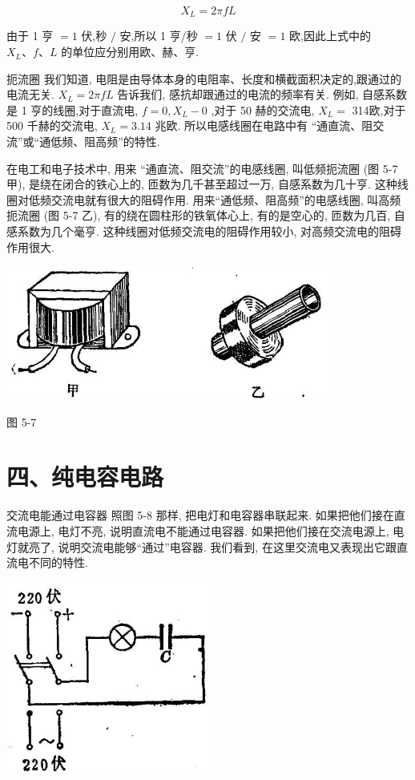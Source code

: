 \documentclass[10pt]{article}
\begin{document}
\[
{X}_{L} = {2\pi fL}
\]

由于 1 亨 \(= 1\) 伏,秒 \(/\) 安,所以 1 亨/秒 \(= 1\) 伏 \(/\) 安 \(= 1\) 欧,因此上式中的 \({X}_{L}\text{、}f\text{、}L\) 的单位应分别用欧、赫、亨.

扼流圈 我们知道, 电阻是由导体本身的电阻率、长度和横截面积决定的,跟通过的电流无关. \({X}_{L} = {2\pi fL}\) 告诉我们, 感抗却跟通过的电流的频率有关. 例如, 自感系数是 1 亨的线圈,对于直流电, \(f = 0,{X}_{L} - 0\) ,对于 50 赫的交流电, \({X}_{L} =\) 314欧,对于 500 千赫的交流电, \({X}_{L} = {3.14}\) 兆欧. 所以电感线圈在电路中有 “通直流、阻交流”或“通低频、阻高频”的特性.

在电工和电子技术中, 用来 “通直流、阻交流”的电感线圈, 叫低频扼流圈 (图 5-7 甲), 是绕在闭合的铁心上的, 匝数为几千甚至超过一万, 自感系数为几十亨. 这种线圈对低频交流电就有很大的阻碍作用. 用来“通低频、阻高频”的电感线圈, 叫高频扼流圈 (图 5-7 乙), 有的绕在圆柱形的铁氧体心上, 有的是空心的, 匝数为几百, 自感系数为几个毫亨. 这种线圈对低频交流电的阻碍作用较小, 对高频交流电的阻碍作用很大.

\begin{center}
\includegraphics[max width=0.8\textwidth]{images/01913056-1f15-74d8-9184-9aab52c9d66b_169_818757.jpg}
\end{center}

图 5-7

\section*{四、纯电容电路}

交流电能通过电容器 照图 5-8 那样, 把电灯和电容器串联起来. 如果把他们接在直流电源上, 电灯不亮, 说明直流电不能通过电容器. 如果把他们接在交流电源上, 电灯就亮了, 说明交流电能够“通过”电容器. 我们看到, 在这里交流电又表现出它跟直流电不同的特性.

\begin{center}
\includegraphics[max width=0.5\textwidth]{images/01913056-1f15-74d8-9184-9aab52c9d66b_170_143810.jpg}
\end{center}
\end{document}
